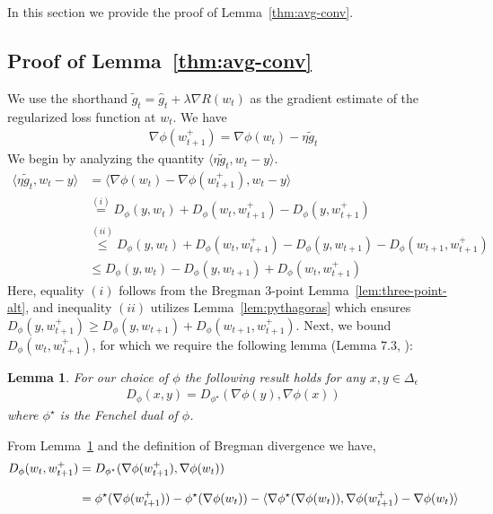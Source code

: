 \documentclass[11pt,letterpaper]{article}
\newcommand{\gtilde}{\widetilde{g}}
\newcommand{\ghat}{\widehat{g}}
\newcommand{\grad}{\nabla}
\theoremstyle{plain}
\newtheorem{lemma}{Lemma}
\theoremstyle{definition}  %
\begin{document}
\noindent In this section we provide the proof of Lemma~\ref{thm:avg-conv}.

\subsection*{Proof of Lemma~\ref{thm:avg-conv}}

\noindent 
We use the shorthand $\gtilde_t = \ghat_t + \lambda \grad R(w_t)$ as the gradient estimate of the regularized loss function at $w_t$. We have 
%
\begin{align}
\label{eqn:wtplus-eqn}
    \grad \phi(w^{+}_{t + 1}) = \grad \phi(w_t) - \eta \gtilde_t 
\end{align}
%
We begin by analyzing the quantity $\langle\eta \widetilde{g}_t,w_t-y\rangle$.
    \begin{align*}
        \langle\eta \widetilde{g}_t,w_t-y\rangle&=\langle\nabla\phi(w_t)-\nabla\phi(w^{+}_{t +1}),w_t-y\rangle\\
        &\stackrel{(i)}{=} D_\phi(y,w_t)+D_\phi(w_t,w^{+}_{t +1})-D_\phi(y,w^{+}_{t +1})\\
        &\stackrel{(ii)}{\leq} D_\phi(y,w_t)+D_\phi(w_t,w^{+}_{t +1})-D_\phi(y,w_{t+1})-D_\phi(w_{t+1},w^{+}_{t +1})\\
        &\le D_\phi(y,w_t)-D_\phi(y,w_{t+1}) + D_\phi(w_t,w^{+}_{t +1})
    \end{align*}
    Here, equality $(i)$ follows from the Bregman 3-point Lemma~\ref{lem:three-point-alt}, and inequality $(ii)$ utilizes Lemma~\ref{lem:pythagoras} which ensures  $D_\phi(y,w^{+}_{t +1})\ge D_\phi(y,w_{t+1})+D_\phi(w_{t+1},w^{+}_{t +1})$. Next, we bound $D_\phi(w_t,w^{+}_{t +1})$, for which we require the following lemma (Lemma $7.3$, \cite{bauschke2001essential}):
    \begin{lemma}\label{lemma:bregman-fenchel}
       For our choice of $\phi$ the following result holds for any $x,y \in \Delta_\epsilon$
       \begin{align*}
            D_\phi(x,y) = D_{\phi^\star}( \nabla \phi(y),\nabla \phi(x))
       \end{align*}
       where $\phi^\star$ is the Fenchel dual of $\phi$.
    \end{lemma}
    \noindent From Lemma~\ref{lemma:bregman-fenchel} and the definition of Bregman divergence we have,
    \begin{align}\label{eqn:breg-firstorder}
    \notag
        D_\phi(w_t,w^{+}_{t +1}) 
        &= D_{\phi^\star}( \nabla \phi(w^{+}_{t+1}),\nabla \phi(w_t))\\[8pt]
        & = \phi^\star(\nabla \phi(w^{+}_{t+1})) - \phi^\star(\nabla \phi(w_t))
        - \langle \nabla \phi^\star(\nabla \phi(w_t)) ,\nabla \phi(w^{+}_{t+1}) - \nabla \phi(w_t) \rangle
    \end{align}
    
\end{document}
